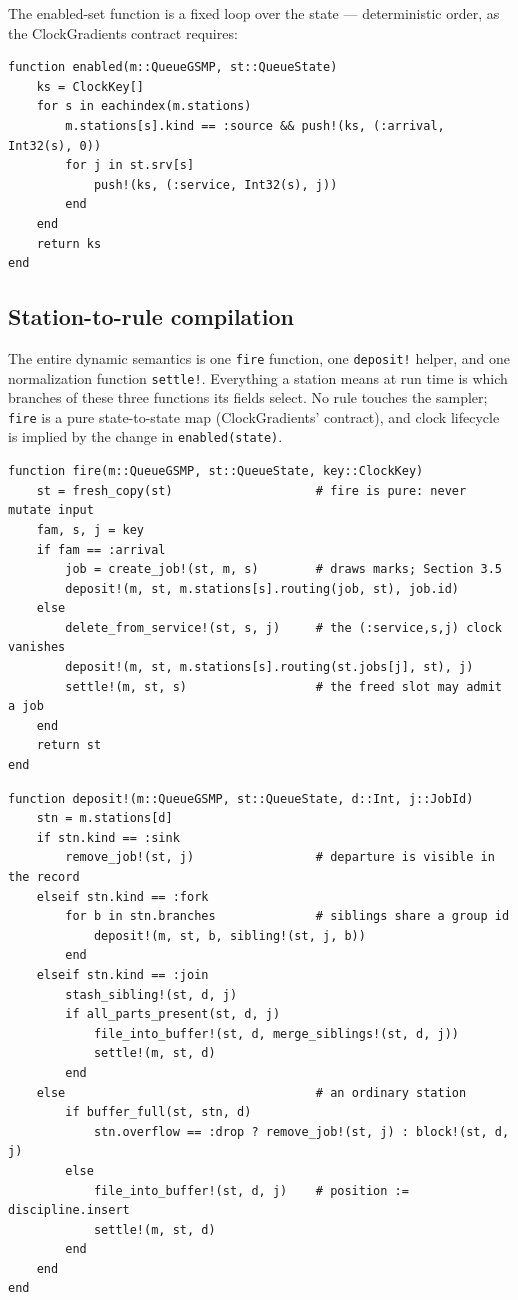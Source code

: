 \documentclass[11pt]{article}
\newcommand{\code}[1]{\texttt{#1}}
\begin{document}
The enabled-set function is a fixed loop over the state --- deterministic
order, as the ClockGradients contract requires:

\begin{lstlisting}
function enabled(m::QueueGSMP, st::QueueState)
    ks = ClockKey[]
    for s in eachindex(m.stations)
        m.stations[s].kind == :source && push!(ks, (:arrival, Int32(s), 0))
        for j in st.srv[s]
            push!(ks, (:service, Int32(s), j))
        end
    end
    return ks
end
\end{lstlisting}

\subsection{Station-to-rule compilation}
\label{sec:compilation}

The entire dynamic semantics is one \code{fire} function, one \code{deposit!}
helper, and one normalization function \code{settle!}. Everything a station
means at run time is which branches of these three functions its fields select.
No rule touches the sampler; \code{fire} is a pure state-to-state map
(ClockGradients' contract), and clock lifecycle is implied by the change in
\code{enabled(state)}.

\begin{lstlisting}
function fire(m::QueueGSMP, st::QueueState, key::ClockKey)
    st = fresh_copy(st)                    # fire is pure: never mutate input
    fam, s, j = key
    if fam == :arrival
        job = create_job!(st, m, s)        # draws marks; Section 3.5
        deposit!(m, st, m.stations[s].routing(job, st), job.id)
    else
        delete_from_service!(st, s, j)     # the (:service,s,j) clock vanishes
        deposit!(m, st, m.stations[s].routing(st.jobs[j], st), j)
        settle!(m, st, s)                  # the freed slot may admit a job
    end
    return st
end
\end{lstlisting}

\begin{lstlisting}
function deposit!(m::QueueGSMP, st::QueueState, d::Int, j::JobId)
    stn = m.stations[d]
    if stn.kind == :sink
        remove_job!(st, j)                 # departure is visible in the record
    elseif stn.kind == :fork
        for b in stn.branches              # siblings share a group id
            deposit!(m, st, b, sibling!(st, j, b))
        end
    elseif stn.kind == :join
        stash_sibling!(st, d, j)
        if all_parts_present(st, d, j)
            file_into_buffer!(st, d, merge_siblings!(st, d, j))
            settle!(m, st, d)
        end
    else                                   # an ordinary station
        if buffer_full(st, stn, d)
            stn.overflow == :drop ? remove_job!(st, j) : block!(st, d, j)
        else
            file_into_buffer!(st, d, j)    # position := discipline.insert
            settle!(m, st, d)
        end
    end
end
\end{lstlisting}
\end{document}
